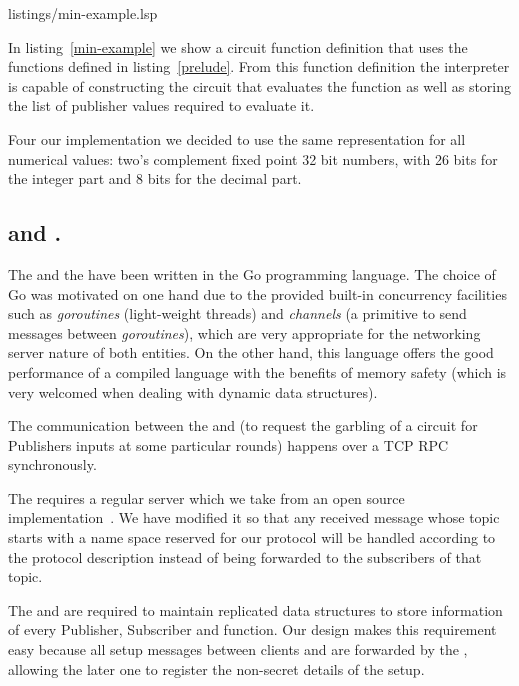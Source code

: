 \smallskip
\noindent
\begin{minipage}{\linewidth}

{listings/min-example.lsp}
\end{minipage}

In listing~\ref{min-example} we show a circuit function definition that uses
the functions defined in listing~\ref{prelude}.  From this function definition
the interpreter is capable of constructing the circuit that evaluates the
function as well as storing the list of publisher values required to evaluate
it.

Four our implementation we decided to use the same representation for all
numerical values: two's complement fixed point 32 bit numbers, with 26 bits for
the integer part and 8 bits for the decimal part.

\vspace{-4pt}
\subsection{\broker and \garbler.}

The \broker and the \garbler have been written in the Go programming
language.  The choice of Go was motivated on one hand due to the provided
built-in concurrency facilities such as \emph{goroutines} (light-weight
threads) and \emph{channels} (a primitive to send messages between
\emph{goroutines}), which are very appropriate for the networking server nature
of both entities.  On the other hand, this language offers the good performance
of a compiled language with the benefits of memory safety (which is very
welcomed when dealing with dynamic data structures).

The communication between the \broker and \garbler (to request the garbling
of a circuit for Publishers inputs at some particular rounds) happens over a
TCP RPC synchronously.

The \broker requires a regular \MQTT{} \broker server which we take from an
open source implementation~\cite{mqttgo}.  We have modified it so that any
received message whose topic starts with a name space reserved for our
protocol will be handled according to the protocol description instead of
being forwarded to the subscribers of that topic.

The \broker and \garbler are required to maintain replicated data structures
to store information of every Publisher, Subscriber and function.  Our design
makes this requirement easy because all setup messages between clients and
\garbler are forwarded by the \broker, allowing the later one to register the
non-secret details of the setup.

